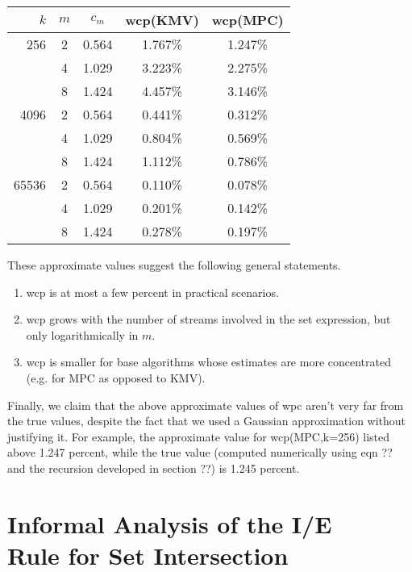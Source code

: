 \documentclass{sig-alternate}
\begin{document}
\begin{center}
\begin{tabular}{|r|c|c|c|c|}
\hline
$k$ & $m$ &  $c_m$ & wcp(KMV) & wcp(MPC) \\
\hline
   256 & 2 & 0.564 & 1.767\% & 1.247\% \\
       & 4 & 1.029 & 3.223\% & 2.275\% \\
       & 8 & 1.424 & 4.457\% & 3.146\% \\
\hline
  4096 & 2 & 0.564 & 0.441\% & 0.312\% \\
       & 4 & 1.029 & 0.804\% & 0.569\% \\
       & 8 & 1.424 & 1.112\% & 0.786\% \\
\hline
 65536 & 2 & 0.564 & 0.110\% & 0.078\% \\
       & 4 & 1.029 & 0.201\% & 0.142\% \\
       & 8 & 1.424 & 0.278\% & 0.197\% \\
\hline
\end{tabular}
\end{center}

\noindent These approximate values suggest the following general statements.

\begin{enumerate}
\item wcp is at most a few percent in practical scenarios.
\item wcp grows with the number of streams involved in the set expression, but only logarithmically in $m$.
\item wcp is smaller for base algorithms whose estimates are more concentrated (e.g. for MPC as opposed to KMV).
\end{enumerate}

Finally, we claim that the above approximate values of wpc aren't very far from the true values, despite the fact that
we used a Gaussian approximation without justifying it. For example, the approximate value for wcp(MPC,k=256) listed above 1.247 percent, 
while the true value (computed numerically using eqn ?? and the recursion developed in section ??) is 1.245 percent.

\section{Informal Analysis of the I/E \\ Rule for Set Intersection}
\end{document}

